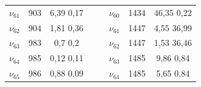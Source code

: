 \begin{table}[H]
\begin{center}
\begin{tabular}{c c c c c c c c}
  				$\nu_{61}$&	903&	6,39	0,17& & & 	$\nu_{60}$&	1434&	46,35	0,22\\
  				$\nu_{62}$&	904&	1,81	0,36& & & 	$\nu_{61}$&	1447&	4,55	36,99\\
  				$\nu_{63}$&	983&	0,7	0,2& & &	$\nu_{62}$&	1447	&1,53	36,46\\
  				$\nu_{64}$&	985&	0,12	0,11& & &	$\nu_{63}$&	1485&	9,86	0,84\\
  				$\nu_{65}$&	986&	0,88	0,09& & & 	$\nu_{64}$&	1485&	5,65	0,84\\
  				\bottomrule
  			\end{tabular}
  		\end{center}
  	\end{table}
  	
  	
  	
  	
  	
